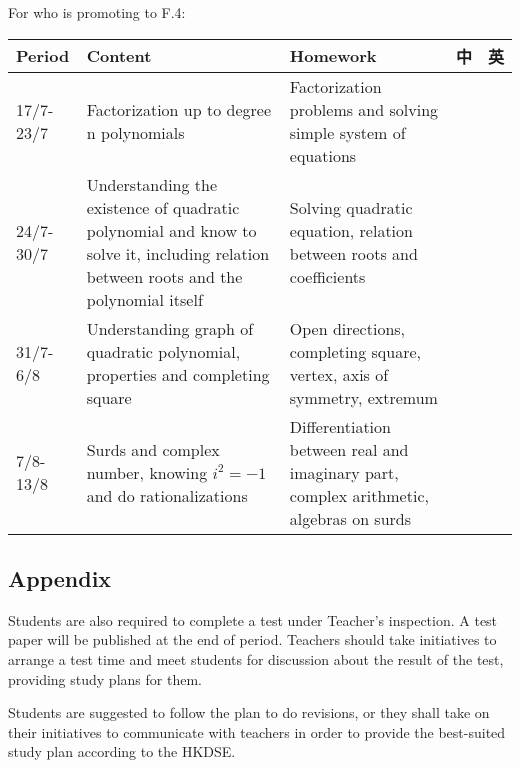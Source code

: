 \documentclass{article}
\begin{document}
    For who is promoting to F.4:
    \begin{center}
        \begin{tabular}{|m{2cm}|m{6cm}|m{6cm}|m{1cm}|m{1cm}|}
            \hline
            Period&Content&Homework&中&英\\
            \hline
            17/7-23/7&Factorization up to degree n polynomials&Factorization problems and solving simple system of equations&&\\
            \hline
            24/7-30/7&Understanding the existence of quadratic polynomial and know to solve it, including relation between roots and the polynomial itself& Solving quadratic equation, relation between roots and coefficients&&\\
            \hline
            31/7-6/8&Understanding graph of quadratic polynomial, properties and completing square&Open directions, completing square, vertex, axis of symmetry, extremum&&\\
            \hline
            7/8-13/8&Surds and complex number, knowing $i^2=-1$ and do rationalizations&Differentiation between real and imaginary part, complex arithmetic, algebras on surds&&\\
            \hline
        \end{tabular}
    \end{center}

    \subsection*{Appendix}

    Students are also required to complete a test under Teacher's inspection. A test paper will be published at the end of period. Teachers should take initiatives to arrange a test time and meet students for discussion about the result of the test, providing study plans for them.

    Students are suggested to follow the plan to do revisions, or they shall take on their initiatives to communicate with teachers in order to provide the best-suited study plan according to the HKDSE.
\end{document}
